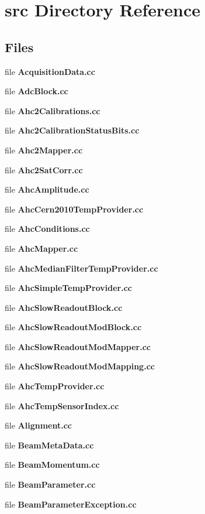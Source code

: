 \section{src Directory Reference}
\label{dir_d459edcbcb33ee7b435aa2c779d1bcb3}
\subsection*{Files}
\begin{DoxyCompactItemize}
\item 
file {\bfseries Acquisition\-Data.\-cc}
\item 
file {\bfseries Adc\-Block.\-cc}
\item 
file {\bfseries Ahc2\-Calibrations.\-cc}
\item 
file {\bfseries Ahc2\-Calibration\-Status\-Bits.\-cc}
\item 
file {\bfseries Ahc2\-Mapper.\-cc}
\item 
file {\bfseries Ahc2\-Sat\-Corr.\-cc}
\item 
file {\bfseries Ahc\-Amplitude.\-cc}
\item 
file {\bfseries Ahc\-Cern2010\-Temp\-Provider.\-cc}
\item 
file {\bfseries Ahc\-Conditions.\-cc}
\item 
file {\bfseries Ahc\-Mapper.\-cc}
\item 
file {\bfseries Ahc\-Median\-Filter\-Temp\-Provider.\-cc}
\item 
file {\bfseries Ahc\-Simple\-Temp\-Provider.\-cc}
\item 
file {\bfseries Ahc\-Slow\-Readout\-Block.\-cc}
\item 
file {\bfseries Ahc\-Slow\-Readout\-Mod\-Block.\-cc}
\item 
file {\bfseries Ahc\-Slow\-Readout\-Mod\-Mapper.\-cc}
\item 
file {\bfseries Ahc\-Slow\-Readout\-Mod\-Mapping.\-cc}
\item 
file {\bfseries Ahc\-Temp\-Provider.\-cc}
\item 
file {\bfseries Ahc\-Temp\-Sensor\-Index.\-cc}
\item 
file {\bfseries Alignment.\-cc}
\item 
file {\bfseries Beam\-Meta\-Data.\-cc}
\item 
file {\bfseries Beam\-Momentum.\-cc}
\item 
file {\bfseries Beam\-Parameter.\-cc}
\item 
file {\bfseries Beam\-Parameter\-Exception.\-cc}

\end{DoxyCompactItemize}
